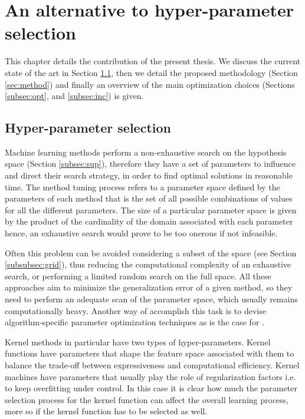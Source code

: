 \chapter{An alternative to hyper-parameter selection}
\label{Chapter3}

This chapter details the contribution of the present thesis.
We discuss the current state of the art in Section \ref{sec:hyper}, then we detail
the proposed methodology (Section \ref{sec:method}) and finally an overview
of the main optimization choices (Sections \ref{subsec:opt}, and \ref{subsec:inc}) is
given.

\section{Hyper-parameter selection}
\label{sec:hyper}
Machine learning methods perform a non-exhaustive search on the hypothesis space
(Section \ref{subsec:sup}), therefore they have a set of parameters to influence
and direct their search strategy, in order to find optimal solutions in reasonable time.
The method tuning process refers to a parameter space defined by the parameters
of each method that is the set of all possible combinations of values for all the
different parameters.
The size of a particular parameter space is given by the product of the cardinality
of the domain associated with each parameter hence, an exhaustive search would
prove to be too onerous if not infeasible.


Often this problem can be avoided considering a subset of the space (see Section
\ref{subsubsec:grid}), thus reducing the computational complexity of an exhaustive
search, or performing a limited random search on the full space.
All these approaches aim to minimize the generalization error of a given method,
so they need to perform an adequate scan of the parameter space, which usually
remains computationally heavy.
Another way of accomplish this task is to devise algorithm-specific parameter
optimization techniques as is the case for \cite{chappelle}.

Kernel methods in particular have two types of hyper-parameters.
Kernel functions have parameters that shape the feature space associated with them
to balance the trade-off between expressiveness and computational efficiency.
Kernel machines have parameters that usually play the role of regularization
factors i.e. to keep overfitting under control.
In this case it is clear how much the parameter selection process for the kernel function
can affect the overall learning process, more so if the kernel function has to be
selected as well.

